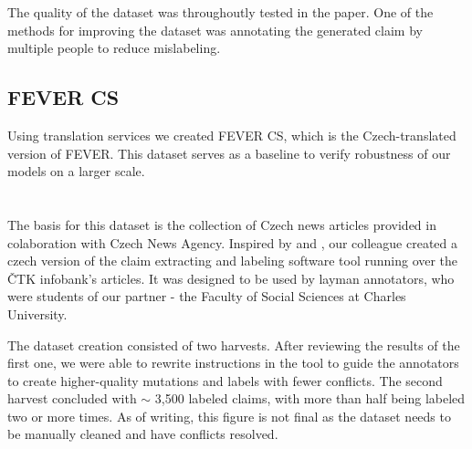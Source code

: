 The quality of the dataset was throughoutly tested in the paper.
One of the methods for improving the dataset was annotating the generated claim by multiple people to reduce mislabeling.

\subsection{FEVER CS}

Using translation services we created FEVER CS, which is the Czech-translated version of FEVER.
This dataset serves as a baseline to verify robustness of our models on a larger scale.

\section{\CTK}

The basis for this dataset is the collection of Czech news articles provided in colaboration with Czech News Agency.
Inspired by \cite{fever} and \cite{danish_fever}, our colleague \cite{ullrich} created a czech version of the claim extracting and labeling software tool running over the ČTK infobank's articles. 
It was designed to be used by layman annotators, who were students of our partner - the Faculty of Social Sciences at Charles University.

The dataset creation consisted of two harvests. 
After reviewing the results of the first one, we were able to rewrite instructions in the tool to guide the annotators to create higher-quality mutations and labels with fewer conflicts.
The second harvest concluded with $\sim$ 3,500 labeled claims, with more than half being labeled two or more times. %
As of writing, this figure is not final as the dataset needs to be manually cleaned and have conflicts resolved. 
